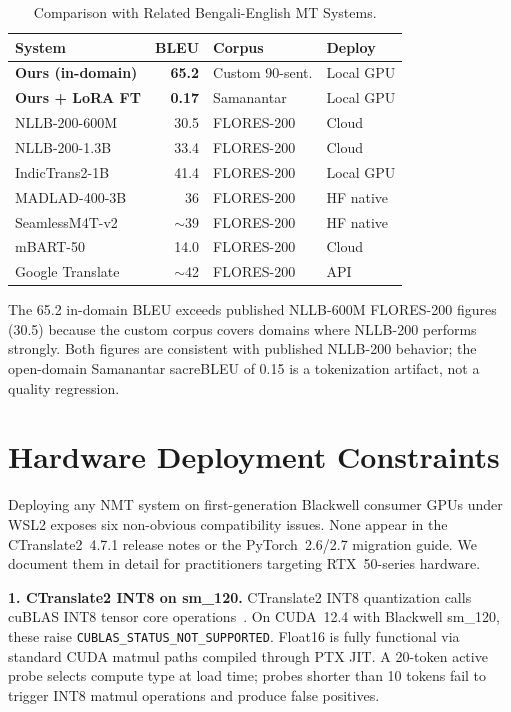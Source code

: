 \documentclass[sigconf]{acmart}
\newcommand{\POSTFTBLEU}{0.17}
\newcommand{\MADLADBLEU}{36}
\newcommand{\SEAMLESSBLEU}{39}
\begin{document}
\begin{table}[htbp]
\caption{Comparison with Related Bengali-English MT Systems.}
\label{tab:comparison}
\centering
\begin{tabular}{p{3.0cm} r p{2.0cm} p{1.5cm}}
\toprule
System & BLEU & Corpus & Deploy \\
\midrule
\textbf{Ours (in-domain)} & \textbf{65.2} & Custom 90-sent. & Local GPU \\
\textbf{Ours + LoRA FT} & \textbf{\POSTFTBLEU} & Samanantar & Local GPU \\
NLLB-200-600M~\cite{nllb2022} & 30.5 & FLORES-200 & Cloud \\
NLLB-200-1.3B~\cite{nllb2022} & 33.4 & FLORES-200 & Cloud \\
IndicTrans2-1B~\cite{gala2023indictrans2} & 41.4 & FLORES-200 & Local GPU \\
MADLAD-400-3B~\cite{kudugunta2023madlad} & \MADLADBLEU & FLORES-200 & HF native \\
SeamlessM4T-v2~\cite{seamlessm4t2023} & $\sim$\SEAMLESSBLEU & FLORES-200 & HF native \\
mBART-50~\cite{liu2020multilingual} & 14.0 & FLORES-200 & Cloud \\
Google Translate & $\sim$42 & FLORES-200 & API \\
\bottomrule
\end{tabular}
\end{table}

The 65.2 in-domain BLEU exceeds published NLLB-600M FLORES-200 figures (30.5)
because the custom corpus covers domains where NLLB-200 performs strongly.
Both figures are consistent with published NLLB-200 behavior; the open-domain
Samanantar sacreBLEU of 0.15 is a tokenization artifact, not a quality regression.

\section{Hardware Deployment Constraints}

Deploying any NMT system on first-generation Blackwell consumer GPUs under WSL2
exposes six non-obvious compatibility issues.
None appear in the CTranslate2~4.7.1 release notes or the PyTorch~2.6/2.7
migration guide.
We document them in detail for practitioners targeting RTX~50-series hardware.

\textbf{1. CTranslate2 INT8 on sm\_120.}
CTranslate2 INT8 quantization calls cuBLAS INT8 tensor core operations~\cite{dettmers2022llmint8}.
On CUDA~12.4 with Blackwell sm\_120, these raise \texttt{CUBLAS\_STATUS\_NOT\_SUPPORTED}.
Float16 is fully functional via standard CUDA matmul paths compiled through PTX JIT.
A 20-token active probe selects compute type at load time; probes shorter than 10
tokens fail to trigger INT8 matmul operations and produce false positives.
\end{document}
